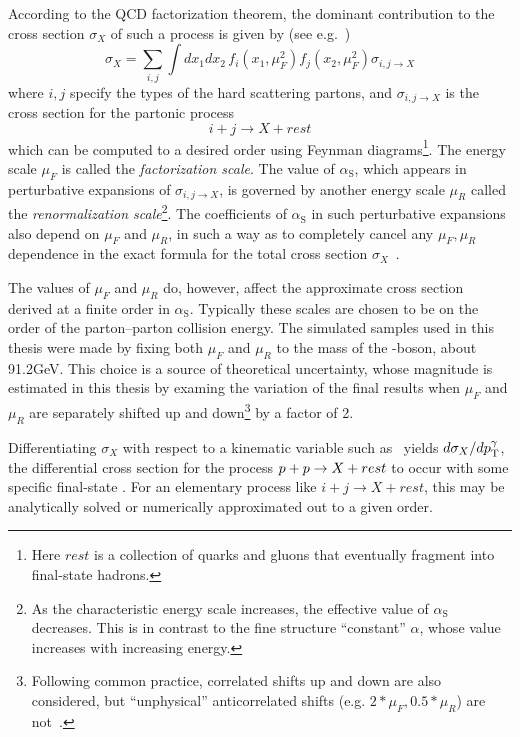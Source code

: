 According to the QCD factorization theorem, the dominant contribution to the cross section $\sigma_{X}$ of such a process is given by (see e.g.~\cite{ref:BargerPhillips})
\begin{equation}
\sigma_{X} = \sum_{i,j}\int \! dx_{1}dx_{2} \, f_{i}(x_{1}, \mu_{F}^{2})f_{j}(x_{2}, \mu_{F}^{2})\sigma_{i,j \to X}
\label{eq:qcd_factorization}
\end{equation}
where $i,j$ specify the types of the hard scattering partons, and $\sigma_{i,j \to X}$ is the cross section for the partonic process
\begin{equation}
i + j \to X + rest
\label{eq:parton_interaction}
\end{equation}
which can be computed to a desired order using Feynman diagrams\footnote{Here $rest$ is a collection of quarks and gluons
that eventually fragment into final-state hadrons.}. The energy scale $\mu_{F}$ is called the \textit{factorization scale}.
The value of $\alpha_\mathrm{S}$, which appears in perturbative expansions of $\sigma_{i,j \to X}$, is governed by another energy scale $\mu_{R}$ called
the \textit{renormalization scale}\footnote{As the characteristic
energy scale increases, the effective value of $\alpha_\mathrm{S}$ decreases. This is in contrast to the fine structure ``constant'' $\alpha$,
whose value increases with increasing energy.}.
The coefficients of $\alpha_\mathrm{S}$ in such perturbative expansions also depend on $\mu_{F}$ and $\mu_{R}$,
in such a way as to completely cancel any $\mu_{F}, \mu_{R}$ dependence in the exact formula for the total cross section $\sigma_{X}$~\cite{ref:0034-4885/70/1/R02}.

The values of $\mu_{F}$ and $\mu_{R}$ do, however, affect the approximate cross section derived at a finite order in $\alpha_\mathrm{S}$.
Typically these scales are chosen to be on the order of the parton--parton collision energy.
The simulated samples used in this thesis were made by fixing both $\mu_{F}$ and $\mu_{R}$ to the mass of the \PZ-boson, about 91.2\unit{GeV}.
This choice is a source of theoretical uncertainty, whose magnitude is estimated in this thesis by
examing the variation of the final results when $\mu_{F}$ and $\mu_{R}$ are separately shifted up and down\footnote{Following common practice, correlated shifts up and down
are also considered, but ``unphysical'' anticorrelated shifts (e.g. $2{*}\mu_{F}, 0.5{*}\mu_{R}$) are not~\cite{ref:scalepdf_bendavid}.} by a factor of 2.

Differentiating $\sigma_{X}$ with respect to a kinematic variable such as \pTgamma\ yields $d\sigma_{X}/dp^{\gamma}_\mathrm{T}$, the differential
cross section for the process $p + p \to X + rest$ to occur with some specific final-state \pTgamma.
For an elementary process like $i + j \to X + rest$, this may be analytically solved or numerically approximated out to a given order.

